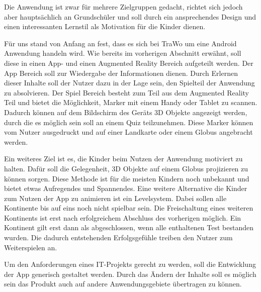 Die Anwendung ist zwar für mehrere Zielgruppen gedacht, richtet sich jedoch aber hauptsächlich an Grundschüler und soll durch ein ansprechendes Design und einen interessanten Lernstil als Motivation für die Kinder dienen.

Für uns stand von Anfang an fest, dass es sich bei TraWo um eine Android Anwendung handeln wird. Wie bereits im vorherigen Abschnitt erwähnt, soll diese in einen App- und einen Augmented Reality Bereich aufgeteilt werden. Der App Bereich soll zur Wiedergabe der Informationen dienen. Durch Erlernen dieser Inhalte soll der Nutzer dazu in der Lage sein, den Spielteil der Anwendung zu absolvieren. Der Spiel Bereich besteht zum Teil aus dem Augmented Reality Teil und bietet die Möglichkeit, Marker mit einem Handy oder Tablet zu scannen. Dadurch können auf dem Bildschirm des Geräts 3D Objekte angezeigt werden, durch die es möglich sein soll an einem Quiz teilzunehmen. Diese Marker können vom Nutzer ausgedruckt und auf einer Landkarte oder einem Globus angebracht werden.

Ein weiteres Ziel ist es, die Kinder beim Nutzen der Anwendung motiviert zu halten. Dafür soll die Gelegenheit, 3D Objekte auf einem Globus projizieren zu können sorgen. Diese Methode ist für die meisten Kindern noch unbekannt und bietet etwas Aufregendes und Spannendes. Eine weitere Alternative die Kinder zum Nutzen der App zu animieren ist ein Levelsystem. Dabei sollen alle Kontinente bis auf eins noch nicht spielbar sein. Die Freischaltung eines weiteren Kontinents ist erst nach erfolgreichem Abschluss des vorherigen möglich. Ein Kontinent gilt erst dann als abgeschlossen, wenn alle enthaltenen Test bestanden wurden. Die dadurch entstehenden Erfolgsgefühle treiben den Nutzer zum Weiterspielen an.

Um den Anforderungen eines IT-Projekts gerecht zu werden, soll die Entwicklung der App generisch gestaltet werden. Durch das Ändern der Inhalte soll es möglich sein das Produkt auch auf andere Anwendungsgebiete übertragen zu können.

